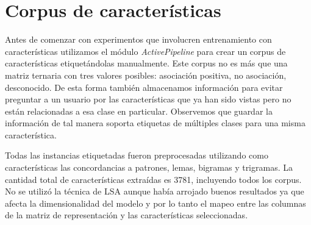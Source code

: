 \section{Corpus de características}



Antes de comenzar con experimentos que involucren entrenamiento con características utilizamos el módulo \textit{ActivePipeline} para crear un corpus de características etiquetándolas manualmente. Este corpus no es más que una matriz ternaria con tres valores posibles: asociación positiva, no asociación, desconocido. De esta forma también almacenamos información para evitar preguntar a un usuario por las características que ya han sido vistas pero no están relacionadas a esa clase en particular. Observemos que guardar la información de tal manera soporta etiquetas de múltiples clases para una misma característica.

Todas las instancias etiquetadas fueron preprocesadas utilizando como características las concordancias a patrones, lemas, bigramas y trigramas. La cantidad total de características extraídas es 3781, incluyendo todos los corpus. No se utilizó la técnica de LSA aunque había arrojado buenos resultados ya que afecta la dimensionalidad del modelo y por lo tanto el mapeo entre las columnas de la matriz de representación y las características seleccionadas.


